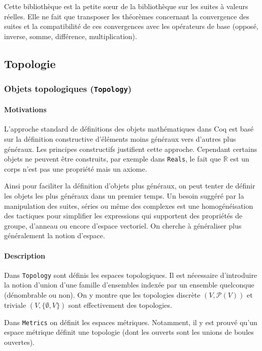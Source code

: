 \documentclass[a4paper,10pt]{article}
\newcommand{\coqcode}[1]{\texttt{#1}}
\begin{document}
Cette bibliothèque est la petite s\oe{}ur de la bibliothèque sur les suites à valeurs réelles. Elle ne fait que transposer les théorèmes concernant la convergence des suites et la compatibilité de ces convergences avec les opérateurs de base (opposé, inverse, somme, différence, multiplication).

\subsection{Topologie}

\subsubsection{Objets topologiques (\coqcode{Topology})}

\paragraph{Motivations}

L'approche standard de définitions des objets mathématiques dans Coq est basé sur la définition constructive d'éléments moins généraux vers d'autres plus généraux. Les principes constructifs justifient cette approche. Cependant certains objets ne peuvent être construits, par exemple dans \coqcode{Reals}, le fait que $\mathbb{R}$ est un corps n'est pas une propriété mais un axiome.

Ainsi pour faciliter la définition d'objets plus généraux, on peut tenter de définir les objets les plus généraux dans un premier temps. Un besoin suggéré par la manipulation des suites, séries ou même des complexes est une homogénéisation des tactiques pour simplifier les expressions qui supportent des propriétés de groupe, d'anneau ou encore d'espace vectoriel. On cherche à généraliser plus généralement la notion d'espace.

\paragraph{Description}

Dans \coqcode{Topology} sont définis les espaces topologiques. Il est nécessaire d'introduire la notion d'union d'une famille d'ensembles indexée par un ensemble quelconque (dénombrable ou non). On y montre que les topologies discrète $(V,\mathcal{P}(V))$ et triviale $(V,\{\emptyset,V\})$ sont effectivement des topologies.

Dans \coqcode{Metrics} on définit les espaces métriques. Notamment, il y est prouvé qu'un espace métrique définit une topologie (dont les ouverts sont les unions de boules ouvertes).
\end{document}
